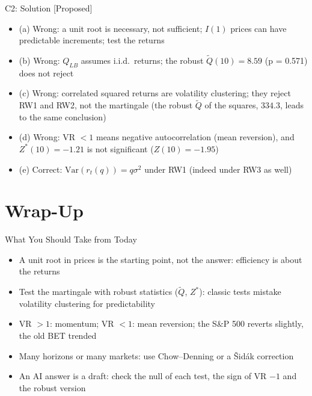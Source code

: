 \ifsolutions
\begin{frame}{C2: Solution [Proposed]}
\itemsize{\footnotesize}
\begin{itemize}
    \item (a) Wrong: a unit root is necessary, not sufficient; $I(1)$ prices can have predictable increments; test the returns
    \item (b) Wrong: $Q_{LB}$ assumes i.i.d.\ returns; the robust $\tilde Q(10) = 8.59$ (p = 0.571) does not reject
    \item (c) Wrong: correlated squared returns are volatility clustering; they reject RW1 and RW2, not the martingale (the robust $\tilde Q$ of the squares, $334.3$, leads to the same conclusion)
    \item (d) Wrong: VR $< 1$ means negative autocorrelation (mean reversion), and $Z^*(10) = -1.21$ is not significant ($Z(10) = -1.95$)
    \item (e) Correct: $\mathrm{Var}(r_t(q)) = q\sigma^2$ under RW1 (indeed under RW3 as well)
\end{itemize}
\end{frame}
\fi


\section{Wrap-Up}

\begin{frame}{What You Should Take from Today}
\itemsize{\small}
\begin{itemize}
    \item A unit root in prices is the starting point, not the answer: efficiency is about the returns
    \item Test the martingale with robust statistics ($\tilde Q$, $Z^*$): classic tests mistake volatility clustering for predictability
    \item VR $> 1$: momentum; VR $< 1$: mean reversion; the S\&P 500 reverts slightly, the old BET trended
    \item Many horizons or many markets: use Chow--Denning or a Šidák correction
    \item An AI answer is a draft: check the null of each test, the sign of VR $- 1$ and the robust version
\end{itemize}
\end{frame}

